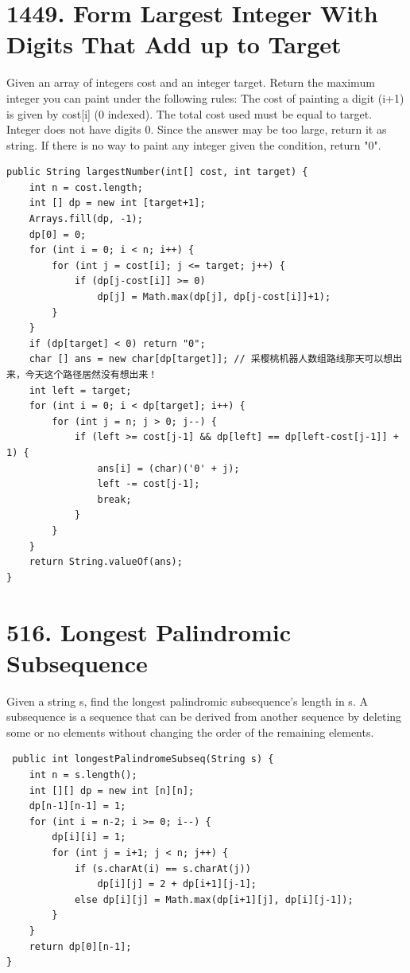\documentclass[9pt, b5paaper]{book}
\begin{document}
\section{1449. Form Largest Integer With Digits That Add up to Target}
\label{sec-1-28}
Given an array of integers cost and an integer target. Return the maximum integer you can paint under the following rules:
The cost of painting a digit (i+1) is given by cost[i] (0 indexed).
The total cost used must be equal to target.
Integer does not have digits 0.
Since the answer may be too large, return it as string.
If there is no way to paint any integer given the condition, return "0".
\begin{verbatim}
public String largestNumber(int[] cost, int target) { 
    int n = cost.length;
    int [] dp = new int [target+1];
    Arrays.fill(dp, -1);
    dp[0] = 0;
    for (int i = 0; i < n; i++) {
        for (int j = cost[i]; j <= target; j++) {
            if (dp[j-cost[i]] >= 0)
                dp[j] = Math.max(dp[j], dp[j-cost[i]]+1);
        }
    }
    if (dp[target] < 0) return "0";
    char [] ans = new char[dp[target]]; // 采樱桃机器人数组路线那天可以想出来，今天这个路径居然没有想出来！
    int left = target;
    for (int i = 0; i < dp[target]; i++) {
        for (int j = n; j > 0; j--) {
            if (left >= cost[j-1] && dp[left] == dp[left-cost[j-1]] + 1) {
                ans[i] = (char)('0' + j);
                left -= cost[j-1];
                break;
            }
        }
    }
    return String.valueOf(ans);
}
\end{verbatim}

\section{516. Longest Palindromic Subsequence}
\label{sec-1-29}
Given a string s, find the longest palindromic subsequence's length in s.
A subsequence is a sequence that can be derived from another sequence by deleting some or no elements without changing the order of the remaining elements.
\begin{verbatim}
 public int longestPalindromeSubseq(String s) {
    int n = s.length();
    int [][] dp = new int [n][n];
    dp[n-1][n-1] = 1;
    for (int i = n-2; i >= 0; i--) {
        dp[i][i] = 1;
        for (int j = i+1; j < n; j++) {
            if (s.charAt(i) == s.charAt(j))
                dp[i][j] = 2 + dp[i+1][j-1];
            else dp[i][j] = Math.max(dp[i+1][j], dp[i][j-1]);
        }
    }
    return dp[0][n-1];
}
\end{verbatim}
\end{document}
